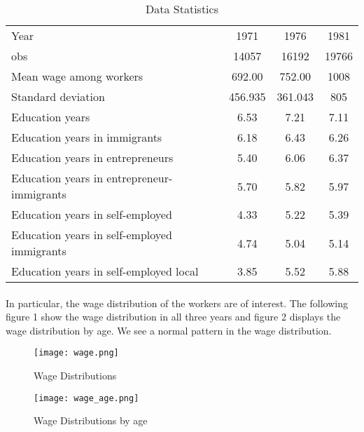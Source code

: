 \documentclass[12pt]{article}
\begin{document}
\begin{table}[H]
\caption{Data Statistics \label{ptf}}
\begin{center}
\begin{tabular}{lccc}
\hline
\hline
Year& 1971 & 1976&1981  \\
obs&14057&16192&19766\\
\hline
Mean wage among workers &692.00	&752.00&	1008\\
Standard deviation &   456.935	&361.043&	805\\
\hline
Education years   &6.53 &7.21 &7.11 \\
Education years in immigrants    &6.18 &6.43&6.26\\
\hline
Education years in entrepreneurs& 5.40	&6.06 &6.37\\
Education years in entrepreneur-immigrants& 5.70&5.82 &5.97\\
\hline
Education years in self-employed& 4.33	&5.22&5.39\\
Education years in self-employed immigrants &4.74&5.04&5.14\\
Education years in self-employed local &3.85&5.52&5.88\\
\hline
\end{tabular}
\end{center}
\end{table}

\paragraph{}
In particular, the wage distribution of the workers are of interest. The following figure 1 show the wage distribution in all three years and figure 2 displays the wage distribution by age. We see a normal pattern in the wage distribution. 

\begin{figure}[H]
\begin{centering}
\caption{Wage Distributions \label{ptf}}

  \texttt{[image: wage.png]}
  \end{centering}
\end{figure}

\begin{figure}[H]
\begin{centering}
\caption{Wage Distributions by age \label{ptf}}
  \texttt{[image: wage\_age.png]}
  \end{centering}
\end{figure}
\end{document}
